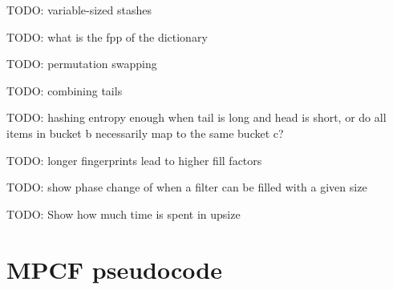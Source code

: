 \documentclass[letterpaper, 11pt]{article}
\begin{document}



TODO: variable-sized stashes

TODO: what is the fpp of the dictionary

TODO: permutation swapping

TODO: combining tails

TODO: hashing entropy enough when tail is long and head is short, or do all items in bucket b necessarily map to the same bucket c?

TODO: longer fingerprints lead to higher fill factors

TODO: show phase change of when a filter can be filled with a given size

TODO: Show how much time is spent in upsize






\appendix
\section{MPCF pseudocode}
\end{document}

